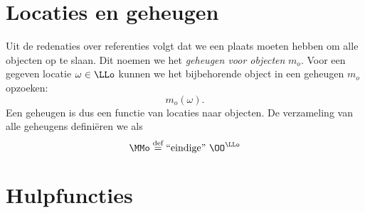 \section{Locaties en geheugen}
\label{sec:locaties}

Uit de redenaties over referenties volgt dat we een plaats moeten hebben om alle objecten op te slaan. Dit noemen we het \emph{geheugen voor objecten} $m_o$. Voor een gegeven locatie $\omega\in\LLo$ kunnen we het bijbehorende object in een geheugen $m_o$ opzoeken:
%
\begin{equation*}
  m_o(\omega).
\end{equation*}
%
Een geheugen is dus een functie van locaties naar objecten. De verzameling van alle geheugens definiëren we als
%
\begin{equation*}
  \MMo \DEF \FiniteFunctions{\OO}{\LLo}
\end{equation*}

\section{Hulpfuncties}


